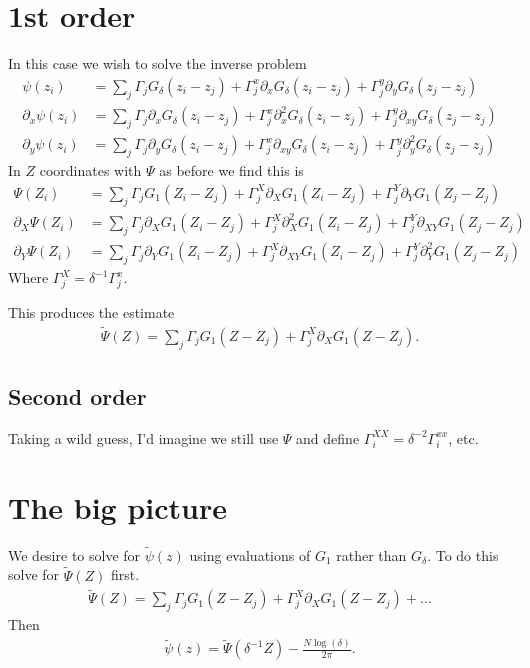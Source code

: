 \documentclass[12pt]{amsart}
\begin{document}
\section{1st order}
In this case we wish to solve the inverse problem
\begin{align*}
  \psi(z_i) &= \sum_{j} \Gamma_j G_\delta(z_i - z_j)
  + \Gamma_j^x \partial_x G_\delta(z_i - z_j)
  + \Gamma_j^y \partial_y G_\delta(z_j - z_j) \\
  \partial_x \psi(z_i) &=  \sum_j \Gamma_j \partial_x G_\delta(z_i - z_j)
  + \Gamma_j^x \partial_x^2 G_\delta(z_i - z_j)
  + \Gamma_j^y \partial_{xy} G_\delta(z_j - z_j) \\
  \partial_y \psi(z_i) &=  \sum_j \Gamma_j \partial_y G_\delta(z_i - z_j)
  + \Gamma_j^x \partial_{xy} G_\delta(z_i - z_j)
  + \Gamma_j^y \partial_{y}^2 G_\delta(z_j - z_j)
\end{align*}
In $Z$ coordinates with $\Psi$ as before we find this is
\begin{align*}
  \Psi(Z_i) &= \sum_{j} \Gamma_j G_1(Z_i - Z_j)
  + \Gamma_j^X \partial_X G_1(Z_i - Z_j)
  + \Gamma_j^Y \partial_Y G_1(Z_j - Z_j) \\
  \partial_X \Psi(Z_i) &=  \sum_j \Gamma_j \partial_X G_1(Z_i - Z_j)
  + \Gamma_j^X \partial_{X}^2 G_1(Z_i - Z_j)
  + \Gamma_j^Y \partial_{XY} G_1(Z_j - Z_j) \\
  \partial_Y \Psi(Z_i) &=  \sum_j \Gamma_j \partial_Y G_1(Z_i - Z_j)
  + \Gamma_j^X \partial_{XY} G_1(Z_i - Z_j)
  + \Gamma_j^Y \partial_{Y}^2 G_1(Z_j - Z_j)
\end{align*}
Where $\Gamma_j^X = \delta^{-1} \Gamma_j^x$.

This produces the estimate
\begin{align*}
  \tilde{\Psi}(Z) = \sum_j \Gamma_j G_1(Z-Z_j) + \Gamma_j^X \partial_X G_1(Z-Z_j).
\end{align*}


\subsection{Second order}
Taking a wild guess, I'd imagine we still use $\Psi$ 
and define $\Gamma_i^{XX} = \delta^{-2} \Gamma_{i}^{xx}$, etc.

\section{The big picture}
We desire to solve for $\tilde{\psi}(z)$
using evaluations of $G_1$ rather than $G_\delta$.
To do this solve for $\tilde{\Psi}(Z)$ first.
\begin{align*}
  \tilde{\Psi}(Z) = \sum_j \Gamma_j G_1(Z-Z_j) 
  + \Gamma_j^X \partial_X G_1(Z-Z_j) + \dots
\end{align*}
Then
\begin{align*}
  \tilde{\psi}(z) = \tilde{\Psi}( \delta^{-1} Z)  - \frac{N \log(\delta)}{2\pi}.
\end{align*}





\end{document}
